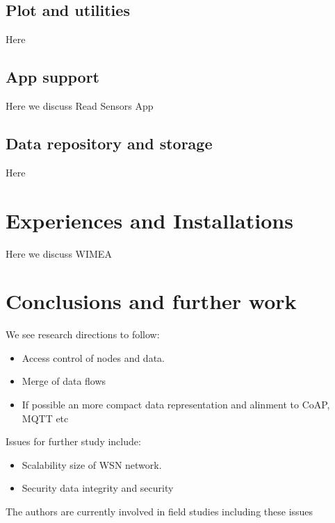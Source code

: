 \documentclass[conference, a4paper,10pt,twocolumn]{IEEEtran}
\begin{document}
\subsection{Plot and utilities}
Here

\subsection{App support}
Here we discuss Read Sensors App  ~\cite{read-sensors}

\subsection{Data repository and storage}
Here

\section{Experiences and Installations}
\label{sec:experince}
Here we discuss WIMEA ~\cite{WIMEA}  ~\cite{WIMEAREPORT}

\section{Conclusions and further work}
\label{sec:conclusion}

We see research directions to follow:

\begin{itemize}
\item Access control of nodes and data. 

\item Merge of data flows 

\item If possible an more compact data representation and alinment to CoAP, MQTT etc

\end{itemize}

Issues for further study include: 

\begin{itemize}
\item Scalability 
\itemHow size of WSN network.

\item Security
\itemHow data integrity and security

\end{itemize} 

The authors are currently involved in field studies including these issues
\end{document}
